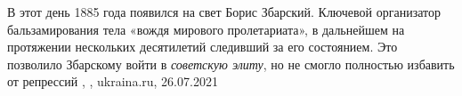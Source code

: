 В этот день 1885 года появился на свет Борис Збарский. Ключевой организатор
бальзамирования тела «вождя мирового пролетариата», в дальнейшем на протяжении
нескольких десятилетий следивший за его состоянием. Это позволило Збарскому
войти в \emph{советскую элиту}, но не смогло полностью избавить от репрессий
, 
, ukraina.ru, 26.07.2021

